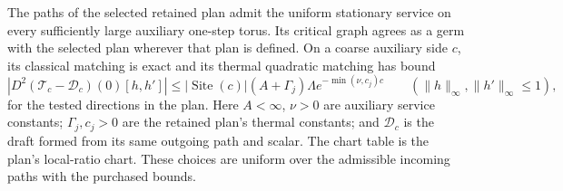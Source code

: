 \begin{lemma}
\label{lem:selected-auxiliary-service}
The paths of the selected retained plan admit the uniform stationary
service on every sufficiently large auxiliary one-step torus. Its
critical graph agrees as a germ with the selected plan wherever that
plan is defined. On a coarse auxiliary side $c$, its classical matching
is exact and its thermal quadratic matching has bound
\begin{equation}\label{eq:selected-auxiliary-thermal}
 |D^2(\mathcal T_c-\mathcal D_c)(0)[h,h']|
 \le |\operatorname{Site}(c)|(A+\Gamma_j)\Lambda
              e^{-\min(\nu,c_j)c}
 \qquad(\|h\|_\infty,\|h'\|_\infty\le1),
\end{equation}
for the tested directions in the plan. Here $A<\infty$, $\nu>0$
are auxiliary service constants; $\Gamma_j,c_j>0$ are the retained
plan's thermal constants; and $\mathcal D_c$ is the draft formed from
its same outgoing path and scalar. The chart table is the plan's
local-ratio chart. These choices are uniform over the admissible
incoming paths with the purchased bounds.
\end{lemma}
